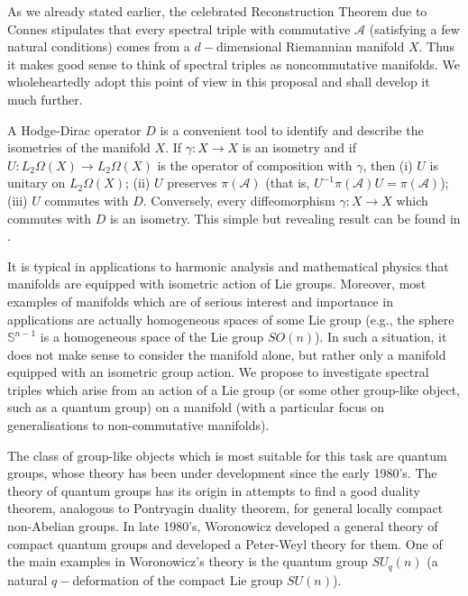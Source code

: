 \documentclass[12pt]{article}
\begin{document}
As we already stated earlier, the celebrated Reconstruction Theorem due to Connes \cite{Connes-reconstruction} stipulates that every spectral triple with commutative $\mathcal{A}$ (satisfying a few natural conditions) comes from a $d-$dimensional Riemannian manifold $X.$ Thus it makes good sense to think of spectral triples as noncommutative manifolds. We wholeheartedly adopt this point of view in this proposal and shall develop it much further.

A Hodge-Dirac operator $D$ is a convenient tool to identify and describe the isometries of the manifold $X.$ If $\gamma:X\to X$ is an isometry and if $U:L_2\Omega(X)\to L_2\Omega(X)$ is the  operator of composition with $\gamma$, then (i) $U$ is unitary on $L_2\Omega(X)$; (ii) $U$ preserves $\pi(\mathcal{A})$ (that is, $U^{-1}\pi(\mathcal{A})U=\pi(\mathcal{A})$); (iii) $U$ commutes with $D.$ Conversely, every diffeomorphism $\gamma:X\to X$ which commutes with $D$ is an isometry. This simple but revealing result can be found in \cite{helgason}.

It is typical in applications to harmonic analysis \cite{helgason} and mathematical physics \cite{c2dft} that manifolds are equipped with isometric action of Lie groups. Moreover, most examples of manifolds which are of serious interest and importance in applications are actually homogeneous spaces of some Lie group (e.g., the sphere $\mathbb{S}^{n-1}$ is a homogeneous space of the Lie group $SO(n)$). In such a situation, it does not make sense to consider the manifold alone, but rather only a manifold equipped with an isometric group action. We propose to investigate spectral triples which arise from an action of a Lie group (or some other group-like object, such as a quantum group) on a manifold (with a particular focus on generalisations to non-commutative manifolds).

The class of group-like objects which is most suitable for this task are quantum groups, whose theory has been under development since the early 1980's. The theory of quantum groups has its origin in attempts to find a good duality theorem, analogous to Pontryagin duality theorem, for general locally compact non-Abelian groups. In late 1980's, Woronowicz developed a general theory of compact quantum groups and developed a Peter-Weyl theory for them. One of the main examples in Woronowicz's theory is the quantum group $SU_q(n)$ (a natural $q-$deformation of the compact Lie group $SU(n)$). 
\end{document}
